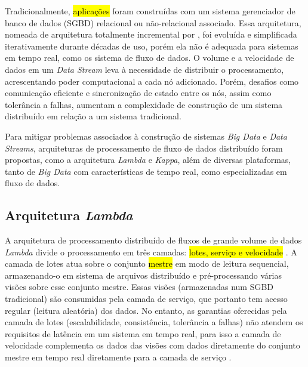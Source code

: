 Tradicionalmente, \hl{aplicações} foram construídas com um sistema gerenciador de
banco de dados (SGBD) relacional ou não-relacional associado. Essa arquitetura,
nomeada de arquitetura totalmente incremental por ,
foi evoluída e simplificada iterativamente durante décadas de uso, porém ela não
é adequada para sistemas em tempo real, como os sistema de fluxo de dados.
O volume e a velocidade de dados em um \emph{Data Stream} leva à necessidade de
distribuir o processamento, acrescentando poder computacional a cada nó
adicionado.
Porém, desafios como comunicação eficiente e sincronização de estado
entre os nós, assim como tolerância a falhas, aumentam a complexidade de
construção de um sistema distribuído em relação a um sistema tradicional.


\newcommand{\lambdaa}{\xspace\emph{Lambda}\xspace}
\newcommand{\kappaa}{\xspace\emph{Kappa}\xspace}

Para mitigar problemas associados à construção de sistemas \emph{Big Data}
e \emph{Data Streams},
arquiteturas de processamento de fluxo
de dados distribuído foram propostas, como a arquitetura \lambdaa
\cite{marz2015big} e \kappaa \cite{Kreps2014}, além
de
diversas plataformas, tanto de \emph{Big Data} com características de tempo real,
como especializadas em fluxo de dados.


\subsection{Arquitetura \lambdaa {}}

A arquitetura de processamento distribuído de fluxos de grande volume de dados
\lambdaa divide o processamento em três camadas:
\hl{lotes, serviço e velocidade} \cite{marz2015big}.
A camada de lotes atua sobre o conjunto \hl{mestre} em modo de leitura
sequencial, armazenando-o em sistema de arquivos distribuído e pré-processando
várias visões sobre esse conjunto mestre.
Essas visões (armazenadas num SGBD
tradicional) são consumidas pela camada de serviço, que portanto tem acesso
regular (leitura aleatória) dos dados.
No entanto, as garantias oferecidas pela camada de
lotes (escalabilidade, consistência, tolerância a falhas) não atendem os requisitos
de latência em um sistema em tempo real, para isso a camada de velocidade
complementa os dados das visões com dados diretamente do conjunto mestre em
tempo real diretamente para a camada de serviço \cite{marz2015big}.

